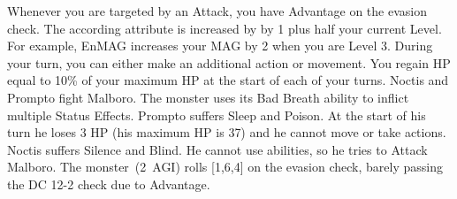 %	
 Whenever you are targeted by an Attack, you have Advantage on the evasion check. \ofgap
%
 The according attribute is increased by by 1 plus half your current Level. For example, EnMAG increases your MAG by 2 when you are Level 3. \ofgap
%
 During your turn, you can either make an additional action or movement. \ofgap
%
 You regain HP equal to 10\% of your maximum HP at the start of each of your turns.
%
\vfill
%
{
	Noctis and Prompto fight Malboro. 
	The monster uses its Bad Breath ability to inflict multiple Status Effects.
	Prompto suffers Sleep and Poison.
	At the start of his turn he loses 3 HP (his maximum HP is 37) and he cannot move or take actions.
	Noctis suffers Silence and Blind.
	He cannot use abilities, so he tries to Attack Malboro. 
	The monster~(2~AGI) rolls [1,6,4] on the evasion check, barely passing the DC 12-2 check due to Advantage.
}
%
\clearpage

